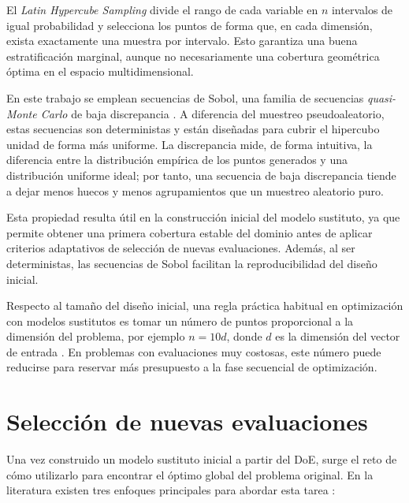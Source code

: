 El \emph{Latin Hypercube Sampling} divide el rango de cada variable en \(n\) intervalos de
igual probabilidad y selecciona los puntos de forma que, en cada dimensión, exista
exactamente una muestra por intervalo. Esto garantiza una buena estratificación marginal,
aunque no necesariamente una cobertura geométrica óptima en el espacio multidimensional.

En este trabajo se emplean secuencias de Sobol, una familia de secuencias
\emph{quasi-Monte Carlo} de baja discrepancia \cite{sobol1967distribution}. A diferencia del
muestreo pseudoaleatorio, estas secuencias son deterministas y están diseñadas para cubrir
el hipercubo unidad de forma más uniforme. La discrepancia mide, de forma intuitiva, la
diferencia entre la distribución empírica de los puntos generados y una distribución uniforme
ideal; por tanto, una secuencia de baja discrepancia tiende a dejar menos huecos y menos
agrupamientos que un muestreo aleatorio puro.

Esta propiedad resulta útil en la construcción inicial del modelo sustituto, ya que permite
obtener una primera cobertura estable del dominio antes de aplicar criterios adaptativos de
selección de nuevas evaluaciones. Además, al ser deterministas, las secuencias de Sobol
facilitan la reproducibilidad del diseño inicial.

Respecto al tamaño del diseño inicial, una regla práctica habitual en optimización con
modelos sustitutos es tomar un número de puntos proporcional a la dimensión del problema,
por ejemplo \(n=10d\), donde \(d\) es la dimensión del vector de entrada \cite{jones1998efficient}.
En problemas con evaluaciones muy costosas, este número puede reducirse para reservar
más presupuesto a la fase secuencial de optimización.

\section{Selección de nuevas evaluaciones}

Una vez construido un modelo sustituto inicial a partir del DoE, surge el reto de cómo utilizarlo para encontrar el óptimo global del problema original. En la literatura existen tres enfoques principales para abordar esta tarea \cite{jiang2020surrogate}:

